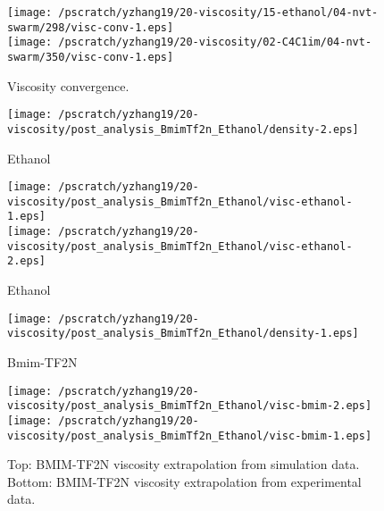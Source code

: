 \documentclass[12pt]{article}
\begin{document}
\newpage
\clearpage
\begin{figure}
\begin{center}
\texttt{[image: /pscratch/yzhang19/20-viscosity/15-ethanol/04-nvt-swarm/298/visc-conv-1.eps]}
\\
\texttt{[image: /pscratch/yzhang19/20-viscosity/02-C4C1im/04-nvt-swarm/350/visc-conv-1.eps]}
\caption{Viscosity convergence.}
\label{fig:visc-conv}
\end{center}
\end{figure}


\newpage
\clearpage
\begin{figure}
\begin{center}
\texttt{[image: /pscratch/yzhang19/20-viscosity/post\_analysis\_BmimTf2n\_Ethanol/density-2.eps]}
\caption{Ethanol}
\label{fig:density-ethanol}
\end{center}
\end{figure}


\newpage
\clearpage
\begin{figure}
\begin{center}
\texttt{[image: /pscratch/yzhang19/20-viscosity/post\_analysis\_BmimTf2n\_Ethanol/visc-ethanol-1.eps]}
\\
\texttt{[image: /pscratch/yzhang19/20-viscosity/post\_analysis\_BmimTf2n\_Ethanol/visc-ethanol-2.eps]}
\caption{Ethanol}
\label{fig:visc-ethanol}
\end{center}
\end{figure}


\newpage
\clearpage
\begin{figure}
\begin{center}
\texttt{[image: /pscratch/yzhang19/20-viscosity/post\_analysis\_BmimTf2n\_Ethanol/density-1.eps]}
\caption{Bmim-TF2N}
\label{fig:density-bmim}
\end{center}
\end{figure}


\newpage
\clearpage
\begin{figure}
\begin{center}
\texttt{[image: /pscratch/yzhang19/20-viscosity/post\_analysis\_BmimTf2n\_Ethanol/visc-bmim-2.eps]}
\\
\texttt{[image: /pscratch/yzhang19/20-viscosity/post\_analysis\_BmimTf2n\_Ethanol/visc-bmim-1.eps]}
\caption{Top: BMIM-TF2N viscosity extrapolation from simulation data.
Bottom: BMIM-TF2N viscosity extrapolation from experimental data.}
\label{fig:visc-bmim}
\end{center}
\end{figure}
\end{document}
